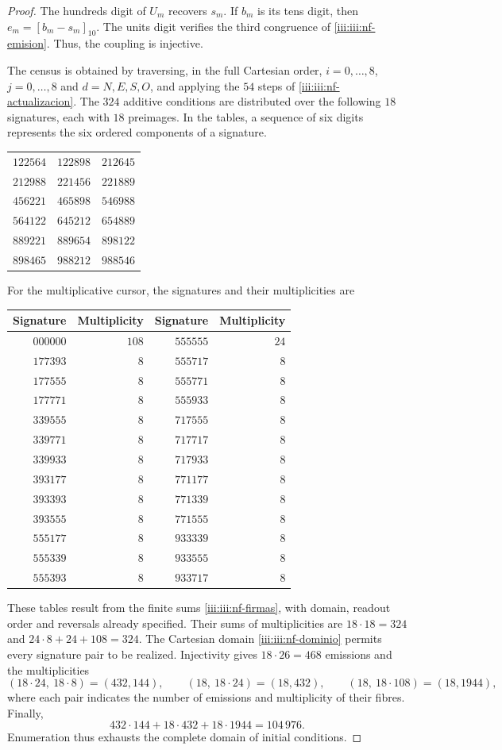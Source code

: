 \begin{proof}
The hundreds digit of $U_m$ recovers $s_m$. If $b_m$ is its
tens digit, then $e_m=[b_m-s_m]_{10}$. The units digit verifies
the third congruence of \eqref{iii:iii:nf-emision}. Thus, the
coupling is injective.

The census is obtained by traversing, in the full Cartesian order,
$i=0,\ldots,8$, $j=0,\ldots,8$ and $d=N,E,S,O$, and applying the $54$
steps of \eqref{iii:iii:nf-actualizacion}. The $324$ additive conditions
are distributed over the following $18$ signatures, each with $18$
preimages. In the tables, a sequence of six digits represents
the six ordered components of a signature.
\begin{center}
\begin{tabular}{ccc}
$122564$&$122898$&$212645$\\
$212988$&$221456$&$221889$\\
$456221$&$465898$&$546988$\\
$564122$&$645212$&$654889$\\
$889221$&$889654$&$898122$\\
$898465$&$988212$&$988546$
\end{tabular}
\end{center}
For the multiplicative cursor, the signatures and their multiplicities are
\begin{center}
\begin{tabular}{rr@{\qquad}rr}
Signature&Multiplicity&Signature&Multiplicity\\ \hline
$000000$&$108$&$555555$&$24$\\
$177393$&$8$&$555717$&$8$\\
$177555$&$8$&$555771$&$8$\\
$177771$&$8$&$555933$&$8$\\
$339555$&$8$&$717555$&$8$\\
$339771$&$8$&$717717$&$8$\\
$339933$&$8$&$717933$&$8$\\
$393177$&$8$&$771177$&$8$\\
$393393$&$8$&$771339$&$8$\\
$393555$&$8$&$771555$&$8$\\
$555177$&$8$&$933339$&$8$\\
$555339$&$8$&$933555$&$8$\\
$555393$&$8$&$933717$&$8$
\end{tabular}
\end{center}
These tables result from the finite sums \eqref{iii:iii:nf-firmas}, with
domain, readout order and reversals already specified. Their sums
of multiplicities are $18\cdot18=324$ and
$24\cdot8+24+108=324$. The Cartesian domain
\eqref{iii:iii:nf-dominio} permits every signature pair to be realized.
Injectivity gives $18\cdot26=468$ emissions and the
multiplicities
\[
 (18\cdot24,\ 18\cdot8)=(432,144),\qquad
 (18,\ 18\cdot24)=(18,432),\qquad
 (18,\ 18\cdot108)=(18,1944),
\]
where each pair indicates the number of emissions and multiplicity of their fibres.
Finally,
\[
 432\cdot144+18\cdot432+18\cdot1944=104\,976.
\]
Enumeration thus exhausts the complete domain of initial conditions.
\end{proof}

